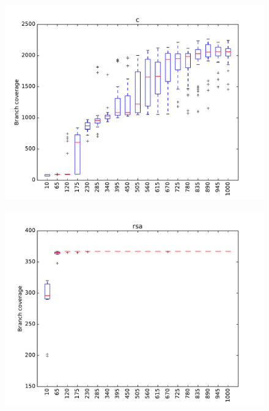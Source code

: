 \begin{figure}
\includegraphics[width=\columnwidth]{graphs/Crand120}
\end{figure}


\begin{figure}
\includegraphics[width=\columnwidth]{graphs/rsarand120}
\end{figure}

